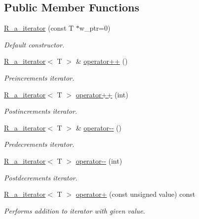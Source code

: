 \subsection*{Public Member Functions}
\begin{DoxyCompactItemize}
\item 
\hyperlink{classtasks_1_1R__a__iterator_a9d044832f48283f42c985cc71db96c06}{R\+\_\+a\+\_\+iterator} (const T $\ast$w\+\_\+ptr=0)
\begin{DoxyCompactList}\small\item\em Default constructor. \end{DoxyCompactList}\item 
\hyperlink{classtasks_1_1R__a__iterator}{R\+\_\+a\+\_\+iterator}$<$ T $>$ \& \hyperlink{classtasks_1_1R__a__iterator_af3bb6ea26091515c174539dde88d66da}{operator++} ()
\begin{DoxyCompactList}\small\item\em Preincrements iterator. \end{DoxyCompactList}\item 
\hyperlink{classtasks_1_1R__a__iterator}{R\+\_\+a\+\_\+iterator}$<$ T $>$ \hyperlink{classtasks_1_1R__a__iterator_ab0f49972f7c832ba846c1bdfbc1c62e2}{operator++} (int)
\begin{DoxyCompactList}\small\item\em Postincrements iterator. \end{DoxyCompactList}\item 
\hyperlink{classtasks_1_1R__a__iterator}{R\+\_\+a\+\_\+iterator}$<$ T $>$ \& \hyperlink{classtasks_1_1R__a__iterator_a0a8a1630423f876ab8176361c19ae3c9}{operator-\/-\/} ()
\begin{DoxyCompactList}\small\item\em Predecrements iterator. \end{DoxyCompactList}\item 
\hyperlink{classtasks_1_1R__a__iterator}{R\+\_\+a\+\_\+iterator}$<$ T $>$ \hyperlink{classtasks_1_1R__a__iterator_a6a0f07ac7c58fbe820d1a5859b5ada3b}{operator-\/-\/} (int)
\begin{DoxyCompactList}\small\item\em Postdecrements iterator. \end{DoxyCompactList}\item 
\hyperlink{classtasks_1_1R__a__iterator}{R\+\_\+a\+\_\+iterator}$<$ T $>$ \hyperlink{classtasks_1_1R__a__iterator_abf8c1d2a5e4d6ebef603db415e5a439f}{operator+} (const unsigned value) const 
\begin{DoxyCompactList}\small\item\em Performs addition to iterator with given value. \end{DoxyCompactList}\item 

\end{DoxyCompactItemize}
